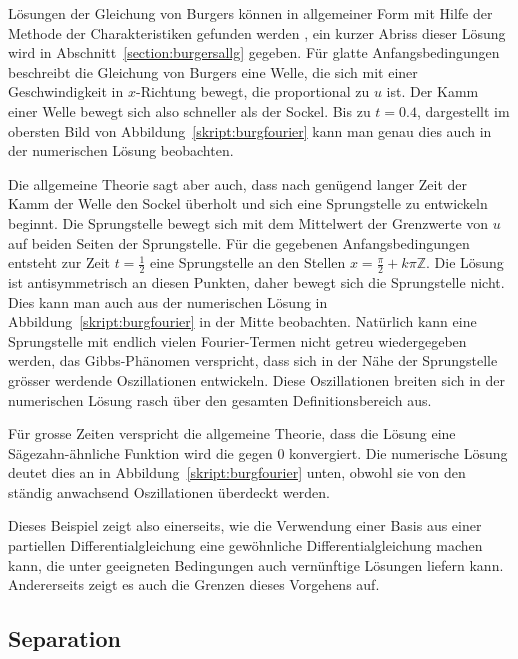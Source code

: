 Lösungen der Gleichung von Burgers können in allgemeiner Form mit
Hilfe der Methode der Charakteristiken gefunden werden \cite{skript:pde},
ein kurzer Abriss dieser Lösung wird in Abschnitt~\ref{section:burgersallg}
gegeben.
Für glatte Anfangsbedingungen beschreibt die Gleichung von Burgers eine
Welle, die sich mit einer Geschwindigkeit in $x$-Richtung bewegt, die
proportional zu $u$ ist.
Der Kamm einer Welle bewegt sich also schneller als der Sockel.
Bis zu $t=0.4$, dargestellt im obersten Bild von
Abbildung~\ref{skript:burgfourier} kann man genau dies auch in der
numerischen Lösung beobachten.

Die allgemeine Theorie sagt aber auch, dass nach genügend langer
Zeit der Kamm der Welle den Sockel überholt und sich eine Sprungstelle
zu entwickeln beginnt.
Die Sprungstelle bewegt sich mit dem Mittelwert der Grenzwerte von $u$
auf beiden Seiten der Sprungstelle.
Für die gegebenen Anfangsbedingungen entsteht zur Zeit $t=\frac12$
eine Sprungstelle an den Stellen $x=\frac{\pi}2+k\pi\mathbb Z$.
Die Lösung ist antisymmetrisch an diesen Punkten, daher bewegt sich
die Sprungstelle nicht.
Dies kann man auch aus der numerischen Lösung in
Abbildung~\ref{skript:burgfourier}
in der Mitte beobachten.
Natürlich kann eine Sprungstelle mit endlich vielen Fourier-Termen
nicht getreu wiedergegeben werden, das Gibbs-Phänomen verspricht,
dass sich in der Nähe der Sprungstelle grösser werdende Oszillationen
entwickeln.
Diese Oszillationen breiten sich in der numerischen Lösung rasch
über den gesamten Definitionsbereich aus.

Für grosse Zeiten verspricht die allgemeine Theorie, dass die Lösung
eine Sägezahn-ähnliche Funktion wird die gegen $0$ konvergiert.
Die numerische Lösung deutet dies an in Abbildung~\ref{skript:burgfourier}
unten, obwohl sie von den ständig anwachsend Oszillationen überdeckt werden.

Dieses Beispiel zeigt also einerseits, wie die Verwendung einer Basis
aus einer partiellen Differentialgleichung
eine gewöhnliche Differentialgleichung machen kann, die unter geeigneten
Bedingungen auch vernünftige Lösungen liefern kann.
Andererseits zeigt es auch die Grenzen dieses Vorgehens auf.

\subsection{Separation}
%
